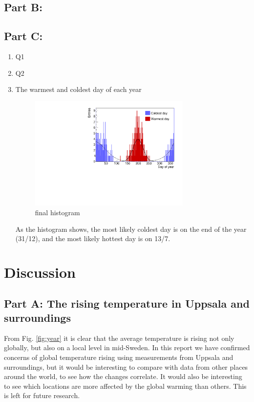 \documentclass[a4paper]{article}
\begin{document}
\subsection{Part B:}

\subsection{Part C:}
\begin{enumerate}
\item Q1
\item Q2
\item The warmest and coldest day of each year
\begin{figure}[H]
    \centering
    \includegraphics[width=8cm]{./images/hotCold_Upp_final}
    \caption{final histogram}
    \label{fig:hist}
\end{figure}
As the histogram shows, the most likely coldest day is on the end of the year (31/12), and the most likely hottest day is on 13/7.

\end{enumerate}

\section{Discussion}
\subsection{Part A: The rising temperature in Uppsala and surroundings}
From Fig. \ref{fig:year} it is clear that the average temperature is rising not only globally, but also on a local level in mid-Sweden. In this report we have confirmed concerns of global temperature rising using measurements from Uppsala and surroundings, but it would be interesting to compare with data from other places around the world, to see how the changes correlate. It would also be interesting to see which locations are more affected by the global warming than others. This is left for future research.
\end{document}
